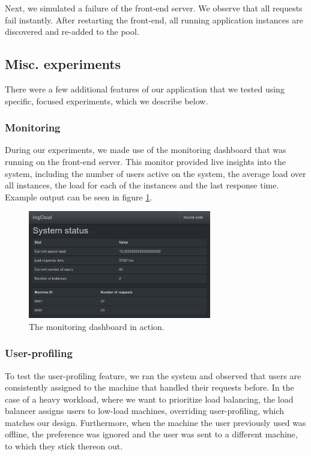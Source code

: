 \documentclass[conference]{IEEEtran}
\begin{document}
Next, we simulated a failure of the front-end server. We observe that all requests fail instantly. After restarting the front-end, all running application instances are discovered and re-added to the pool.


\subsection{Misc. experiments}

There were a few additional features of our application that we tested using specific, focused experiments, which we describe below.

\subsubsection{Monitoring}
During our experiments, we made use of the monitoring dashboard that was running on the front-end server. This monitor provided live insights into the system, including the number of users active on the system, the average load over all instances, the load for each of the instances and the last response time. Example output can be seen in figure \ref{monitoring-dash}.

\begin{figure}
  \centering
    \includegraphics[width=80mm]{imgcloud_dash.png}
  \caption{The monitoring dashboard in action.}
  \label{monitoring-dash}
\end{figure}


\subsubsection{User-profiling}
To test the user-profiling feature, we ran the system and observed that users are consistently assigned to the machine that handled their requests before. In the case of a heavy workload, where we want to prioritize load balancing, the load balancer assigns users to low-load machines, overriding user-profiling, which matches our design. Furthermore, when the machine the user previously used was offline, the preference was ignored and the user was sent to a different machine, to which they stick thereon out.
\end{document}
